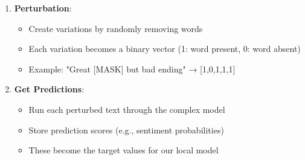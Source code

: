 \documentclass{article}
\begin{document}
\begin{enumerate}
    \item \textbf{Perturbation}:
        \begin{itemize}
            \item Create variations by randomly removing words
            \item Each variation becomes a binary vector (1: word present, 0: word absent)
            \item Example: "Great [MASK] but bad ending" → [1,0,1,1,1]
        \end{itemize}
    
    \item \textbf{Get Predictions}:
        \begin{itemize}
            \item Run each perturbed text through the complex model
            \item Store prediction scores (e.g., sentiment probabilities)
            \item These become the target values for our local model
        \end{itemize}
    

\end{enumerate}
\end{document}
